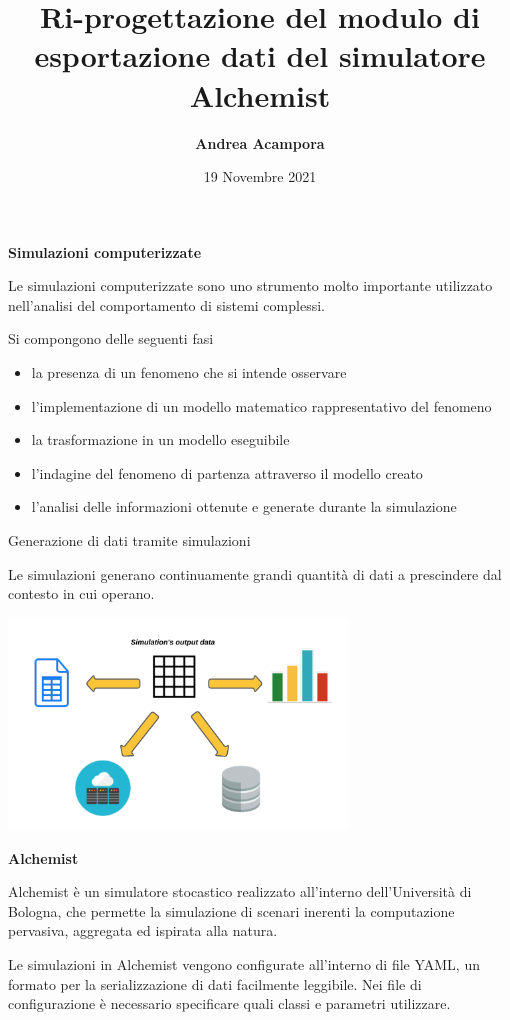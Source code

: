 \documentclass{beamer}
\title[Un nuovo modulo di esportazione dati]{\textbf{Ri-progettazione del modulo di esportazione dati del simulatore Alchemist}}
\author{\textbf{Andrea Acampora}}
\institute[] {
    Alma Mater Studiorum $\cdot$ Università di Bologna \\ Campus di Cesena\\
    Dipartimento di Informatica, Scienza e Ingegneria
}
\date{19 Novembre 2021}
\begin{document}
\begin{frame}
  \titlepage
\end{frame}

\begin{frame}{\textbf{Simulazioni computerizzate}}
\begin{block}{Le simulazioni computerizzate sono}
uno strumento molto importante utilizzato nell'analisi del comportamento di sistemi complessi.
\end{block}

\begin{block}{Si compongono delle seguenti fasi}
\begin{itemize}
    \item la presenza di un fenomeno che si intende osservare
    \item l'implementazione di un modello matematico rappresentativo del fenomeno
    \item la trasformazione in un modello eseguibile
    \item l'indagine del fenomeno di partenza attraverso il modello creato
    \item l'analisi delle informazioni ottenute e generate durante la simulazione
\end{itemize}
\end{block}
\end{frame}

\begin{frame}{Generazione di dati tramite simulazioni}
\begin{block}{Le simulazioni}
generano continuamente grandi quantità di dati a prescindere dal contesto in cui operano.
\end{block}
\hfil\hfil\includegraphics[width=9cm]{images/output_data.png}
\end{frame}

\begin{frame}{\textbf{Alchemist}}
\begin{block}{Alchemist}
è un simulatore stocastico realizzato all'interno dell'Università di Bologna, che permette la simulazione di scenari inerenti la computazione pervasiva, aggregata ed ispirata alla natura.
\end{block}
\begin{block}{Le simulazioni in Alchemist}
vengono configurate all’interno di file YAML, un formato per la serializzazione di dati facilmente leggibile. Nei file di configurazione è necessario specificare quali classi e parametri utilizzare.
\end{block}
\end{frame}
\end{document}
